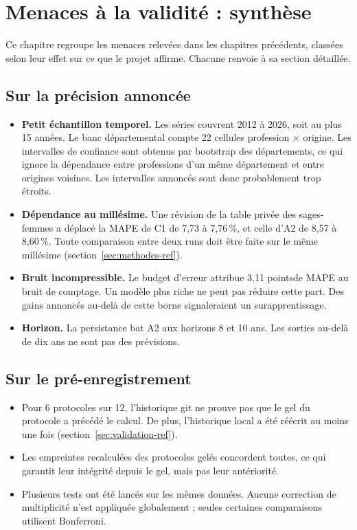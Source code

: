 \section{Menaces à la validité : synthèse}\label{sec:menaces-ref}

Ce chapitre regroupe les menaces relevées dans les chapitres précédents, classées selon leur effet sur ce que le
projet affirme. Chacune renvoie à sa section détaillée.

\subsection{Sur la précision annoncée}
\begin{itemize}
\item \textbf{Petit échantillon temporel.} Les séries couvrent 2012 à 2026, soit au plus 15 années. Le banc
  départemental compte 22 cellules profession × origine. Les intervalles de confiance sont obtenus par bootstrap des
  départements, ce qui ignore la dépendance entre professions d'un même département et entre origines voisines. Les
  intervalles annoncés sont donc probablement trop étroits\derive.
\item \textbf{Dépendance au millésime.} Une révision de la table privée des sages-femmes a déplacé la MAPE de C1
  de 7,73 à 7,76\,\%\mesure, et celle d'A2 de 8,57 à 8,60\,\%\mesure. Toute comparaison entre deux runs doit être
  faite sur le même millésime (section~\ref{sec:methodes-ref}).
\item \textbf{Bruit incompressible.} Le budget d'erreur attribue 3,11 points\mesure de MAPE au bruit de comptage.
  Un modèle plus riche ne peut pas réduire cette part. Des gains annoncés au-delà de cette borne signaleraient un
  surapprentissage.
\item \textbf{Horizon.} La persistance bat A2 aux horizons 8 et 10 ans\mesure. Les sorties au-delà de dix ans ne
  sont pas des prévisions.
\end{itemize}

\subsection{Sur le pré-enregistrement}
\begin{itemize}
\item Pour 6 protocoles sur 12, l'historique git ne prouve pas que le gel du protocole a précédé le calcul. De plus,
  l'historique local a été réécrit au moins une fois (section~\ref{sec:validation-ref}).
\item Les empreintes recalculées des protocoles gelés concordent toutes\mesure, ce qui garantit leur intégrité
  depuis le gel, mais pas leur antériorité.
\item Plusieurs tests ont été lancés sur les mêmes données. Aucune correction de multiplicité n'est appliquée
  globalement ; seules certaines comparaisons utilisent Bonferroni.
\end{itemize}

